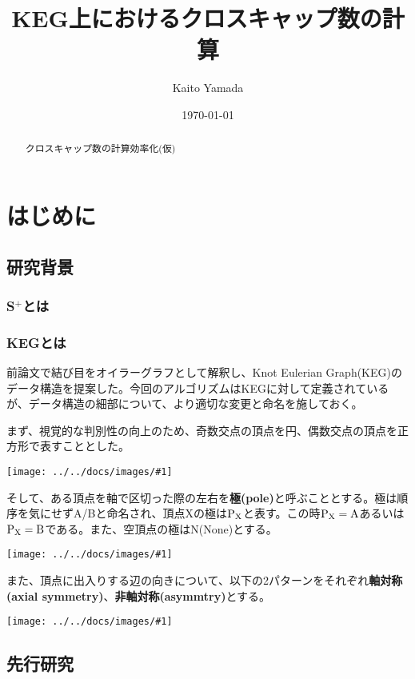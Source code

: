 \documentclass[11pt,a4j]{jarticle}
\title{KEG上におけるクロスキャップ数の計算}
\author{Kaito Yamada}
\date{\today}
\newcommand{\splus}{S${}^\text{+}$}
\newcommand{\f}[1]{$\rm{#1}$} %
\newcommand{\image}[1]{\begin{center}\texttt{[image: ../../docs/images/\#1]}\end{center}}
\begin{document}
\maketitle
\vspace{30mm}
\begin{abstract}
    クロスキャップ数の計算効率化(仮)
\end{abstract}

\clearpage

\tableofcontents
\clearpage

\pagestyle{plain}
\lhead{\rightmark}

\section{はじめに}

\subsection{研究背景}
\subsubsection{\splus とは}
\subsubsection{KEGとは}
前論文\cite{keg}で結び目をオイラーグラフとして解釈し、Knot Eulerian Graph(KEG)のデータ構造を提案した。今回のアルゴリズムはKEGに対して定義されているが、データ構造の細部について、より適切な変更と命名を施しておく。

まず、視覚的な判別性の向上のため、奇数交点の頂点を円、偶数交点の頂点を正方形で表すこととした。
\image{about_parity.jpg}

そして、ある頂点を軸で区切った際の左右を\textbf{極(pole)}と呼ぶこととする。極は順序を気にせずA/Bと命名され、頂点Xの極は\f{P_X}と表す。この時\f{P_X=A}あるいは\f{P_X=B}である。また、空頂点の極はN(None)とする。
\image{about_pole.jpg}

また、頂点に出入りする辺の向きについて、以下の2パターンをそれぞれ\textbf{軸対称(axial symmetry)}、\textbf{非軸対称(asymmtry)}とする。
\image{about_axis.jpg}

\subsection{先行研究}
\end{document}

